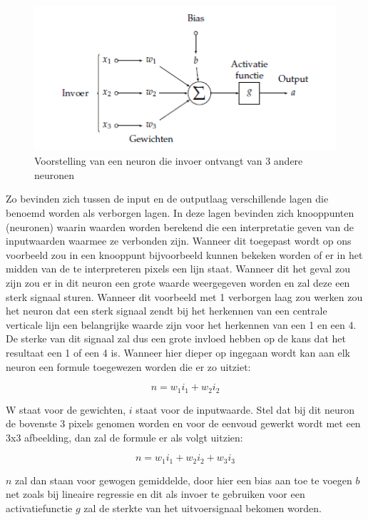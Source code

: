 \begin{figure}
    \centering
    \caption{Voorstelling van een neuron die invoer ontvangt van 3 andere neuronen ~\autocite{Lievens2018a}}
    \label{fig:neuron}
    \includegraphics[width=0.7\linewidth]{neuron}
\end{figure}

Zo bevinden zich tussen de input en de outputlaag verschillende lagen die benoemd worden als verborgen lagen. In deze lagen bevinden zich knooppunten (neuronen) waarin waarden worden berekend die een interpretatie geven van de inputwaarden waarmee ze verbonden zijn. Wanneer dit toegepast wordt op ons voorbeeld zou in een knooppunt bijvoorbeeld kunnen bekeken worden of er in het midden van de te interpreteren pixels een lijn staat. Wanneer dit het geval zou zijn zou er in dit neuron een grote waarde weergegeven worden en zal deze een sterk signaal sturen. Wanneer dit voorbeeld met 1 verborgen laag zou werken zou het neuron dat een sterk signaal zendt bij het herkennen van een centrale verticale lijn een belangrijke waarde zijn voor het herkennen van een 1 en een 4. De sterke van dit signaal zal dus een grote invloed hebben op de kans dat het resultaat een 1 of een 4 is.
Wanneer hier dieper op ingegaan wordt kan aan elk neuron een formule toegewezen worden die er zo uitziet:

\begin{equation}
n=w_1 i_1+w_2 i_2
\end{equation}

W staat voor de gewichten, $i$ staat voor de inputwaarde. Stel dat bij dit neuron de bovenste 3 pixels genomen worden en voor de eenvoud gewerkt wordt met een 3x3 afbeelding, dan zal de formule er als volgt uitzien:

\begin{equation}
n=w_1 i_1+w_2 i_2+ w_3 i_3
\end{equation}

$n$ zal dan staan voor gewogen gemiddelde, door hier een bias aan toe te voegen $b$ net zoals bij lineaire regressie en dit als invoer te gebruiken voor een activatiefunctie $g$ zal de sterkte van het uitvoersignaal bekomen worden. 


